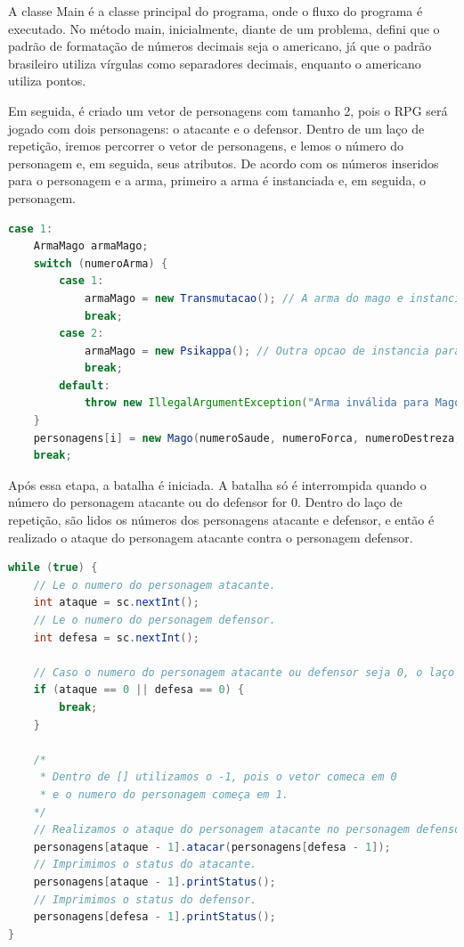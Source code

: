 \documentclass[11pt]{uiobrev}
\begin{document}
A classe Main é a classe principal do programa, onde o fluxo do programa é executado. No método main, inicialmente, diante de um problema, defini que o padrão de formatação de números decimais seja o americano, já que o padrão brasileiro utiliza vírgulas como separadores decimais, enquanto o americano utiliza pontos.

Em seguida, é criado um vetor de personagens com tamanho 2, pois o RPG será jogado com dois personagens: o atacante e o defensor. Dentro de um laço de repetição, iremos percorrer o vetor de personagens, e lemos o número do personagem e, em seguida, seus atributos. De acordo com os números inseridos para o personagem e a arma, primeiro a arma é instanciada e, em seguida, o personagem.

\begin{lstlisting}[language=Java, caption={Instanciação da Arma e do Personagem}]
case 1:
    ArmaMago armaMago;
    switch (numeroArma) {
        case 1:
            armaMago = new Transmutacao(); // A arma do mago e instanciada aqui com base no numero fornecido.
            break;
        case 2:
            armaMago = new Psikappa(); // Outra opcao de instancia para a arma do mago.
            break;
        default:
            throw new IllegalArgumentException("Arma inválida para Mago.");
    }
    personagens[i] = new Mago(numeroSaude, numeroForca, numeroDestreza, armaMago); // O personagem Mago é instanciado aqui com os atributos e a arma escolhida.
    break;
\end{lstlisting}

Após essa etapa, a batalha é iniciada. A batalha só é interrompida quando o número do personagem atacante ou do defensor for 0. Dentro do laço de repetição, são lidos os números dos personagens atacante e defensor, e então é realizado o ataque do personagem atacante contra o personagem defensor.

\begin{lstlisting}[language=Java, caption={While da Batalha}]
while (true) {
    // Le o numero do personagem atacante.
    int ataque = sc.nextInt();
    // Le o numero do personagem defensor.
    int defesa = sc.nextInt();

    // Caso o numero do personagem atacante ou defensor seja 0, o laço e interrompido.
    if (ataque == 0 || defesa == 0) {
        break;
    }

    /*
     * Dentro de [] utilizamos o -1, pois o vetor comeca em 0 
     * e o numero do personagem começa em 1. 
    */
    // Realizamos o ataque do personagem atacante no personagem defensor.
    personagens[ataque - 1].atacar(personagens[defesa - 1]);
    // Imprimimos o status do atacante.
    personagens[ataque - 1].printStatus();
    // Imprimimos o status do defensor.
    personagens[defesa - 1].printStatus();
}
\end{lstlisting}
\end{document}
